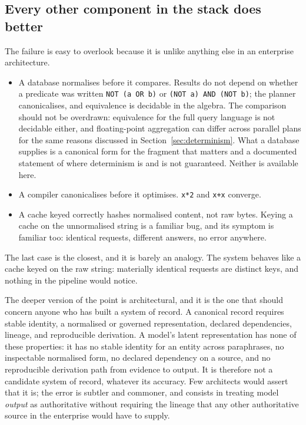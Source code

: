 \documentclass[11pt]{article}
\theoremstyle{plain}
\theoremstyle{definition}
\begin{document}
\subsection{Every other component in the stack does better}

The failure is easy to overlook because it is unlike anything else in an enterprise
architecture.

\begin{itemize}
  \item A database normalises before it compares. Results do not depend on whether
        a predicate was written \texttt{NOT (a OR b)} or \texttt{(NOT a) AND (NOT
        b)}; the planner canonicalises, and equivalence is decidable in the
        algebra. The comparison should not be overdrawn: equivalence for the full
        query language is not decidable either, and floating-point aggregation can
        differ across parallel plans for the same reasons discussed in
        Section~\ref{sec:determinism}. What a database supplies is a canonical form
        for the fragment that matters and a documented statement of where determinism
        is and is not guaranteed. Neither is available here.
  \item A compiler canonicalises before it optimises. \texttt{x*2} and
        \texttt{x+x} converge.
  \item A cache keyed correctly hashes normalised content, not raw bytes. Keying a
        cache on the unnormalised string is a familiar bug, and its symptom is
        familiar too: identical requests, different answers, no error anywhere.
\end{itemize}

The last case is the closest, and it is barely an analogy. The system behaves like a
cache keyed on the raw string: materially identical requests are distinct keys, and
nothing in the pipeline would notice.

The deeper version of the point is architectural, and it is the one that should
concern anyone who has built a system of record. A canonical record requires stable
identity, a normalised or governed representation, declared dependencies, lineage,
and reproducible derivation. A model's latent representation has none of these
properties: it has no stable identity for an entity across paraphrases, no
inspectable normalised form, no declared dependency on a source, and no reproducible
derivation path from evidence to output. It is therefore not a candidate system of
record, whatever its accuracy. Few architects would assert that it is; the error is
subtler and commoner, and consists in treating model \emph{output} as authoritative
without requiring the lineage that any other authoritative source in the enterprise
would have to supply.
\end{document}
